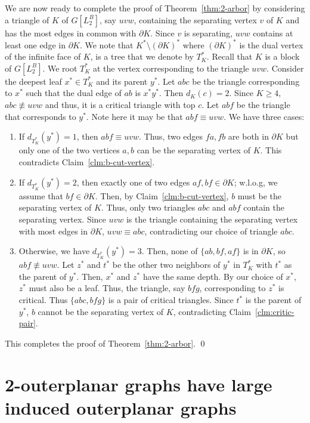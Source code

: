 \documentclass[11pt]{article}
\begin{document}
We are now ready to complete the proof of Theorem~\ref{thm:2-arbor} by considering a triangle of $K$ of $G[L_2^B]$, say $uvw$, containing the separating vertex $v$ of $K$ and has the most edges in common with $\partial K$. Since $v$ is separating, $uvw$ contains at least one edge in $\partial K$. We note that $K^*\setminus (\partial K)^*$ where $(\partial K)^*$ is the dual vertex of the infinite face of $K$, is a tree that we denote by $T^*_K$. Recall that $K$ is a block of $G[L^B_2]$. We root $T^*_K$ at the vertex corresponding to the triangle $uvw$. Consider the deepest leaf $x^* \in T^*_K$ and its parent $y^*$. Let $abc$ be the triangle corresponding to $x^*$ such that the dual edge of $ab$ is $x^*y^*$. Then $d_K(c) = 2$. Since $K \geq 4$, $abc \not\equiv uvw$ and thus, it is a critical triangle with top $c$. Let $abf$  be the triangle that corresponds to $y^*$. Note here it may be that $abf \equiv uvw$.  We have three cases:

\begin{enumerate}
\item If $d_{T^*_K}(y^*) = 1$, then $abf \equiv uvw$. Thus, two edges $fa,fb$ are both in $\partial K$ but only one of the two vertices $a,b$ can be the separating vertex of $K$. This contradicts Claim~\ref{clm:b-cut-vertex}.
\item If $d_{T^*_K}(y^*) = 2$, then exactly one of two edges $af, bf \in \partial K$; w.l.o.g, we assume that $bf \in \partial K$. Then, by Claim~\ref{clm:b-cut-vertex}, $b$ must be the separating vertex of $K$. Thus, only two triangles $abc$ and $abf$ contain the separating vertex. Since $uvw$ is the triangle containing the separating vertex with most edges in $\partial K$, $uvw \equiv abc$, contradicting our choice of triangle $abc$.
 \item Otherwise, we have $d_{T^*_K}(y^*) = 3$. Then, none of $\{ab,bf,af\}$ is in $\partial K$, so $abf \not\equiv uvw$. Let $z^*$ and $t^*$ be the other two neighbors of $y^*$ in $T^*_K$ with $t^*$ as the parent of $y^*$. Then, $x^*$ and $z^*$ have the same depth. By our choice of $x^*$, $z^*$ must also be a leaf. Thus, the triangle, say $bfg$, corresponding to $z^*$ is critical. Thus $\{abc, bfg\}$ is a pair of critical triangles. Since $t^*$ is the parent of $y^*$, $b$ cannot be the separating vertex of $K$, contradicting Claim~\ref{clm:critic-pair}.
\end{enumerate}
This completes the proof of Theorem~\ref{thm:2-arbor}. \qed



\section{2-outerplanar graphs have large induced outerplanar graphs}\label{sec:2-to-1}
\end{document}
